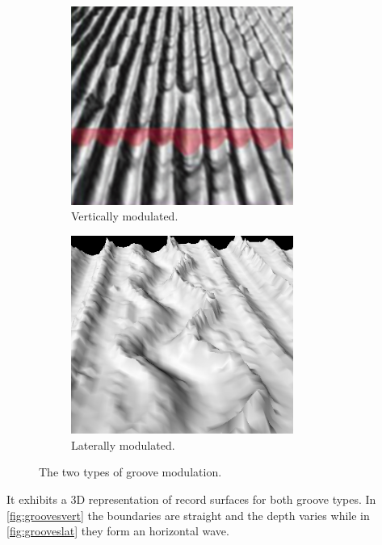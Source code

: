\begin{figure}[!ht]
    \begin{subfigure}[b]{0.49\textwidth}
    \centering
    \includegraphics[width=0.8\textwidth]{images/grooves-vertical}
    \caption{Vertically modulated.}
    \label{fig:groovesvert}
    \end{subfigure}
    \begin{subfigure}[b]{0.49\textwidth}
    \centering
    \includegraphics[width=0.8\textwidth]{images/grooves-lateral}
    \caption{Laterally modulated.}
    \label{fig:grooveslat}
    \end{subfigure}
    \caption{The two types of groove modulation.}
    \label{fig:groovesdiff}
\end{figure}

It exhibits a 3D representation of record surfaces for both groove types. In \autoref{fig:groovesvert} the boundaries are straight and the depth  varies while in \autoref{fig:grooveslat} they form an horizontal wave.

